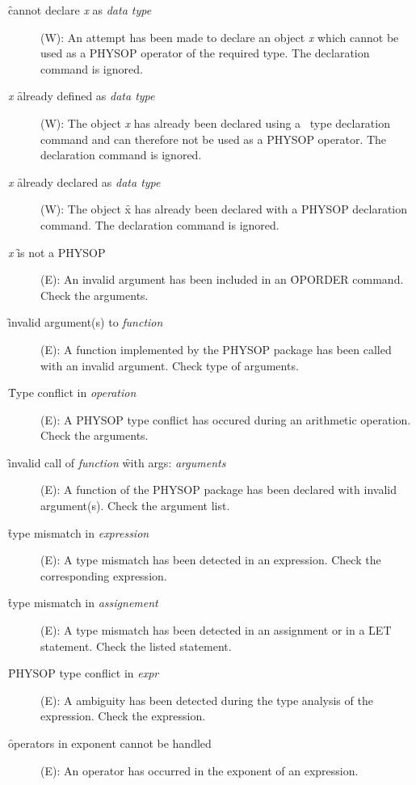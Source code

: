 \begin{description}
\item[\f{cannot declare} {\it x}\f{ as }{\it data type}] (W):
 An attempt has been made to declare an
object {\it x} which cannot be used as a PHYSOP operator of the
required type. The declaration command is ignored.

\item [{\it x} \f{already defined as} {\it data type}] (W): The object
{\it x} has already been declared using a \REDUCE\ type declaration
command and can therefore not be used as a PHYSOP operator.
The declaration command is ignored.

\item [{\it x} \f{already declared as} {\it data type}] (W): The object
\f{x} has already been declared with a PHYSOP declaration command.
The declaration command is ignored.

\item[{\it x} \f{is not a PHYSOP}] (E): An invalid argument has been
included in an \f{OPORDER} command. Check the arguments.

\item[\f{invalid argument(s) to }{\it function}] (E): A
function implemented by the PHYSOP package has been called with an
invalid argument. Check type of arguments.


\item[\f{Type conflict in }{\it operation}] (E): A PHYSOP type conflict
has occured during an arithmetic operation. Check the arguments.

\item [\f{invalid call of }{\it function} \f{with args:} {\it arguments}]
(E): A function
of the PHYSOP package has been declared with invalid argument(s). Check
the argument list.

\item[\f{type mismatch in} {\it expression}] (E): A type mismatch has
been detected in an expression.  Check the corresponding expression.

\item[\f{type mismatch in} {\it assignement}] (E): A type
mismatch has been detected in an assignment or in a \f{LET}
statement. Check the listed statement.

\item[\f{PHYSOP type conflict in} {\it expr}] (E): A ambiguity has been
detected during the type analysis of the expression. Check the
expression.

\item[\f{operators in exponent cannot be handled}] (E): An operator has
occurred in the exponent of an expression.


\end{description}
